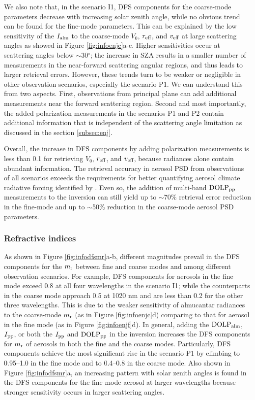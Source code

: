 We also note that, in the scenario I1, DFS components for the coarse-mode
parameters decrease with increasing solar zenith angle, while no obvious trend
can be found for the fine-mode parameters. This can be explained by the low
sensitivity of the $I_\text{alm}$ to the coarse-mode $V_0$, $r_\text{eff}$, and $v_\text{eff}$ at
large scattering angles as showed in Figure \ref{fig:infoenjc}a-c. Higher 
sensitivities occur at scattering angles below $\sim$30$^\circ$; the increase
in SZA results in a smaller number of measurements in the near-forward 
scattering angular regions, and thus leads to larger retrieval errors. 
However, these trends turn to be weaker or negligible in other observation 
scenarios, especially the scenario P1. We can understand this from two aspects.
First, observations from principal plane can add additional measurements near
the forward scattering region. Second and most importantly, the added 
polarization measurements in the scenarios P1 and P2 contain additional 
information that is independent of the scattering angle limitation as 
discussed in the section \ref{subsec:enj}.

Overall, the increase in DFS components by adding polarization measurements is
less than 0.1 for retrieving $V_0$, $r_\text{eff}$, and $v_\text{eff}$, because radiances alone
contain abundant information. The retrieval accuracy in aerosol PSD from
observations of all scenarios exceeds the requirements for better quantifying
aerosol climate radiative forcing identified by \citet{Mishchenko04}. Even
so, the addition of multi-band $\text{DOLP}_\text{pp}$ measurements to the inversion can
still yield up to $\sim$70\% retrieval error reduction in the fine-mode and up
to $\sim$50\% reduction in the coarse-mode aerosol PSD parameters. 

\subsubsection{Refractive indices}

As shown in Figure \ref{fig:infodfsmr}a-b, different magnitudes prevail in
the DFS components for the $m_\text{r}$ between fine and coarse modes and among
different observation scenarios. For example, DFS components for aerosols in
the fine mode exceed 0.8 at all four wavelengths in the scenario I1; while
the counterparts in the coarse mode approach 0.5 at 1020 nm and are less than
0.2 for the other three wavelengths. This is due to the weaker sensitivity of
almucantar radiances to the coarse-mode $m_\text{r}$  (as in Figure
\ref{fig:infoenjc}d) comparing to that for aerosol in the fine
mode (as in Figure \ref{fig:infoenjf}d). In general, adding the $\text{DOLP}_\text{alm}$,
$I_\text{pp}$, or both the $I_\text{pp}$ and $\text{DOLP}_\text{pp}$ in the inversion increases the DFS
components for $m_\text{r}$ of aerosols in both the fine and the coarse modes. 
Particularly, DFS components achieve the most significant rise in the scenario
P1 by climbing to 0.95--1.0 in the fine mode and to 0.4--0.8 in the coarse 
mode. Also shown in Figure \ref{fig:infodfsmr}a, an increasing pattern with
solar zenith angles is found in the DFS components for the fine-mode aerosol
at larger wavelengths because stronger sensitivity occurs in larger scattering
angles.

